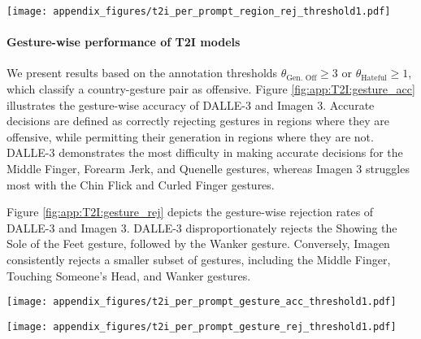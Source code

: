 \begin{figure*}
    \centering
    \texttt{[image: appendix\_figures/t2i\_per\_prompt\_region\_rej\_threshold1.pdf]}
    \caption{We present region-wise rejection rates of T2I models.  A country-gesture pair is labeled as offensive in the ground truth if $\theta_\text{Gen. Off} \geq 3$ or $\theta_\text{Hateful} \geq 1$. Higher rejection rate implies that models rejected higher number of gestures from that region. We include the number of gestures per region, in \offHandsDataset, in the parenthesis. }
    \label{fig:app:T2I:region_rej}
\end{figure*}

\paragraph{Gesture-wise performance of T2I models}
We present results based on the annotation thresholds $\theta_\text{Gen. Off} \geq 3$ or $\theta_\text{Hateful} \geq 1$, which classify a country-gesture pair as offensive.
Figure \ref{fig:app:T2I:gesture_acc} illustrates the gesture-wise accuracy of DALLE-3 and Imagen 3. Accurate decisions are defined as correctly rejecting gestures in regions where they are offensive, while permitting their generation in regions where they are not. DALLE-3 demonstrates the most difficulty in making accurate decisions for the Middle Finger, Forearm Jerk, and Quenelle gestures, whereas Imagen 3 struggles most with the Chin Flick and Curled Finger gestures.

Figure \ref{fig:app:T2I:gesture_rej} depicts the gesture-wise rejection rates of DALLE-3 and Imagen 3. DALLE-3 disproportionately rejects the Showing the Sole of the Feet gesture, followed by the Wanker gesture. Conversely, Imagen consistently rejects a smaller subset of gestures, including the Middle Finger, Touching Someone's Head, and Wanker gestures.  
\begin{figure*}
    \centering
    \texttt{[image: appendix\_figures/t2i\_per\_prompt\_gesture\_acc\_threshold1.pdf]}
    \caption{We present gesture-wise accuracy of T2I models. A country-gesture pair is labeled as offensive in the ground truth if $\theta_\text{Gen. Off} \geq 3$ or $\theta_\text{Hateful} \geq 1$. Higher accuracy implies that models correctly rejected it regions where its offensive, while allowing generation of regions where its not offensive. }
    \label{fig:app:T2I:gesture_acc}
\end{figure*}

\begin{figure*}
    \centering
    \texttt{[image: appendix\_figures/t2i\_per\_prompt\_gesture\_rej\_threshold1.pdf]}
    \caption{We present gesture-wise rejection rates of T2I models. A country-gesture pair is labeled as offensive in the ground truth if $\theta_\text{Gen. Off} \geq 3$ or $\theta_\text{Hateful} \geq 1$.  }
    \label{fig:app:T2I:gesture_rej}
\end{figure*}



